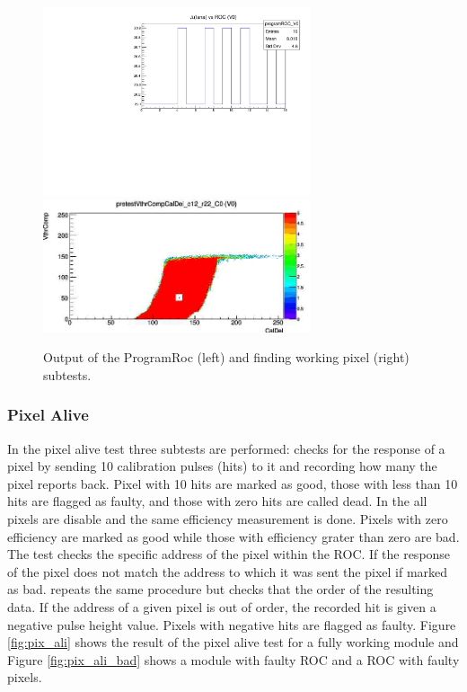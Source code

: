 \begin{figure}[!h]
  \centering
  \includegraphics[width=0.7\textwidth]{../images/ch7/pro_roc}
  \includegraphics[width=0.7\textwidth]{../images/ch7/working_point}
  \caption[Programable ROC and working point]{Output of the ProgramRoc (left) and finding working pixel (right) subtests.}\label{fig:pretest}
\end{figure}

\subsubsection{Pixel Alive}
In the pixel alive test three subtests are performed:  checks for the response of a pixel by sending 10 calibration pulses (hits) to it and recording how many the pixel reports back. Pixel with 10 hits are marked as good, those with less than 10 hits are flagged as faulty, and those with zero hits are called dead. In the  all pixels are disable and the same efficiency measurement is done. Pixels with zero efficiency are marked as good while those with efficiency grater than zero are bad. The  test checks the specific address of the pixel within the ROC. If the response of the pixel does not match the address to which it was sent the pixel if marked as bad. repeats the same procedure but checks that the order of the resulting data. If the address of a given pixel is out
of order, the recorded hit is given a negative pulse height value. Pixels with negative
hits are flagged as faulty. Figure \ref{fig:pix_ali} shows the result of the pixel alive test for a fully working module and Figure \ref{fig:pix_ali_bad} shows a module with faulty ROC and a ROC with faulty pixels. 

